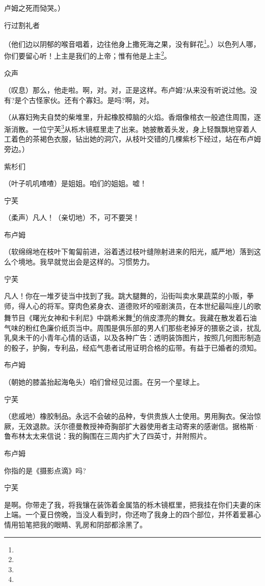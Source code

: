 \par 卢姆之死而恸哭。）
\par 行过割礼者
\par （他们边以阴郁的喉音唱着，边往他身上撒死海之果，没有鲜花\footnote{}。）以色列人哪，你们要留心听！上主是我们的上帝；惟有他是上主\footnote{}。
\par 众声
\par （叹息）那么，他走啦。啊，对。对，正是这样。布卢姆?从来没有听说过他。没有?是个古怪家伙。还有个寡妇。是吗?啊，对。
\par （从寡妇殉夫自焚的柴堆里，升起橡胶樟脑的火焰。香烟像棺衣一般遮住周围，逐渐消散。一位宁芙\footnote{}从栎木镜框里走了出来。她披散着头发，身上轻飘飘地穿着人工着色的茶褐色衣服，钻出她的洞穴，从枝叶交错的几棵紫杉下经过，站在布卢姆旁边。）
\par 紫杉们
\par （叶子叽叽喳喳）是姐姐。咱们的姐姐。嘘！
\par 宁芙
\par （柔声）凡人！（亲切地）不，可不要哭！
\par 布卢姆
\par （软绵绵地在枝叶下匍匐前进，浴着透过枝叶缝隙射进来的阳光，威严地）落到这么个境地。我早就觉出会是这样的。习惯势力。
\par 宁芙
\par 凡人！你在一堆歹徒当中找到了我。跳大腿舞的，沿街叫卖水果蔬菜的小贩，拳师，得人心的将军。穿肉色紧身衣、道德败坏的哑剧演员，在本世纪最叫座儿的歌舞节目《曙光女神和卡利尼》中跳希米舞\footnote{}的俏皮漂亮的舞女。我藏在散发着石油气味的粉红色廉价纸页当中。周围是俱乐部的男人们那些老掉牙的猥亵之谈，扰乱乳臭未干的小青年心情的话语，以及各种广告：透明装饰图片，按照几何图形制造的骰子，护胸，专利品，经疝气患者试用证明合格的疝带。有益于已婚者的须知。
\par 布卢姆
\par （朝她的膝盖抬起海龟头）咱们曾经见过面。在另一个星球上。
\par 宁芙
\par （悲戚地）橡胶制品。永远不会破的品种，专供贵族人士使用。男用胸衣。保治惊厥，无效退款。沃尔德曼教授神奇胸部扩大器使用者主动寄来的感谢信。据格斯·鲁布林太太来信说：我的胸围在三周内扩大了四英寸，并附照片。
\par 布卢姆
\par 你指的是《摄影点滴》吗?
\par 宁芙
\par 是啊。你带走了我，将我镶在装饰着金属箔的栎木镜框里，把我挂在你们夫妻的床上端。一个夏日傍晚，当没人看到时，你还吻了我身上的四个部位，并怀着爱慕心情用铅笔把我的眼睛、乳房和阴部都涂黑了。
